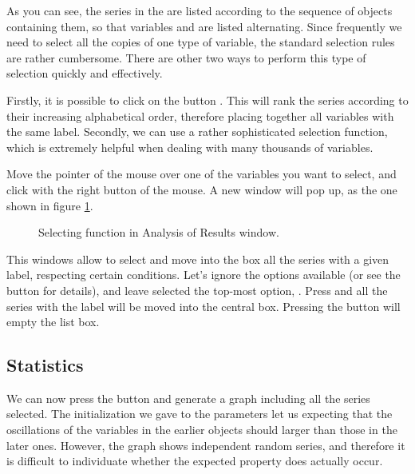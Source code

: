 \documentclass [11pt,a4paper] {book}
\begin{document}
As you can see, the series in the  are listed according to the sequence of objects containing them, so that variables  and  are listed alternating. Since frequently we need to select all the copies of one type of variable, the standard selection rules are rather cumbersome. There are other two ways to perform this type of selection quickly and effectively.

Firstly, it is possible to click on the button . This will rank the series according to their increasing alphabetical order, therefore placing together all variables with the same label. Secondly, we can use a rather sophisticated selection function, which is extremely helpful when dealing with many thousands of variables.

Move the pointer of the mouse over one of the variables you want to select, and click with the right button of the mouse. A new window will pop up, as the one shown in figure \ref{fig:selection}.

\begin{figure}[ht]
  \centering
  \caption{Selecting function in Analysis of Results window.}
  \label{fig:selection}
\end{figure}

This windows allow to select and move into the  box all the series with a given label, respecting certain conditions. Let's ignore the options available (or see the  button for details), and leave selected the top-most option, . Press  and all the series with the label will be moved into the central box. Pressing the button  will empty the  list box.

\subsection{Statistics}
We can now press the button  and generate a graph including all the series selected. The initialization we gave to the parameters let us expecting that the oscillations of the variables in the earlier objects should larger than those in the later ones. However, the graph shows independent random series, and therefore it is difficult to individuate whether the expected property does actually occur.
\end{document}
